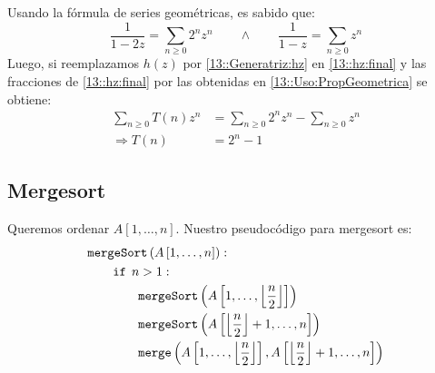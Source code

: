 \documentclass[english, spanish, fleqn, 10pt]{article}
\numberwithin{equation}{section}
\newcommand{\nparentesis}[1]{\left( #1 \right)}
\newcommand{\ncorchetes}[1]{\left[ #1 \right]}
\theoremstyle{definition}
\begin{document}
Usando la fórmula de series geométricas, es sabido que:
\begin{equation}\label{13::Uso:PropGeometrica}
\dfrac{1}{1-2z}=\sum_{n\geq 0}2^nz^n\qquad\wedge\qquad \dfrac{1}{1-z}=\sum_{n\geq 0}z^n
\end{equation}
Luego, si reemplazamos $h\nparentesis{z}$ por \eqref{13::Generatriz:hz} en \eqref{13::hz:final} y las fracciones de \eqref{13::hz:final} por las obtenidas en \eqref{13::Uso:PropGeometrica} se obtiene:
\begin{align*}
\sum_{n\geq 0}T\nparentesis{n}z^n&=\sum_{n\geq 0}2^nz^n-\sum_{n\geq 0}z^n\\
\Rightarrow T\nparentesis{n}&=2^n-1
\end{align*}


\subsection{Mergesort}
Queremos ordenar $A\ncorchetes{1, \ldots, n}$. Nuestro pseudocódigo para mergesort es:
\begin{align*}
&\mathtt{mergeSort}\nparentesis{A\ncorchetes{1, \ldots, n}}:\\
&\hspace{2em}\mathtt{if }\hspace{1ex} n>1:\\
&\hspace{4em}\mathtt{mergeSort}\nparentesis{A\ncorchetes{1, \ldots, \left\lfloor \frac{n}{2}\right\rfloor}}\\
&\hspace{4em}\mathtt{mergeSort}\nparentesis{A\ncorchetes{\left\lfloor \frac{n}{2}\right\rfloor+1, \ldots, n}}\\
&\hspace{4em}\mathtt{merge}\nparentesis{ A\ncorchetes{1, \ldots, \left\lfloor \frac{n}{2}\right\rfloor}   , A\ncorchetes{\left\lfloor \frac{n}{2}\right\rfloor+1, \ldots, n}}
\end{align*}
\end{document}
